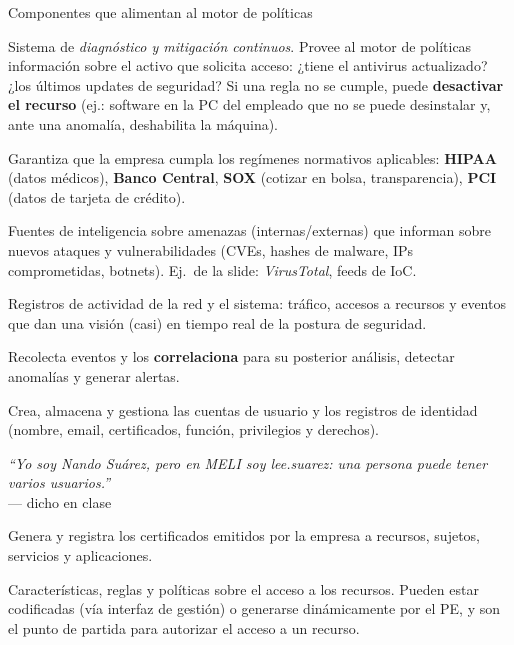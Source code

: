 \documentclass[11pt,a4paper]{article}
\newcommand{\prof}[1]{\par\medskip\noindent\textit{``#1''}\\[-2pt]\hspace*{1em}%
  {\footnotesize\textcolor{black!60}{--- dicho en clase}}\par\medskip\noindent}
\begin{document}
\begin{defbox}{Componentes que alimentan al motor de políticas}
\begin{description}[leftmargin=0pt,labelsep=0.4em,style=nextline,itemsep=2pt]
  \item[CDM — Continuous Diagnostics and Mitigation] Sistema de \emph{diagnóstico y mitigación
        continuos}. Provee al motor de políticas información sobre el activo que solicita acceso:
        ¿tiene el antivirus actualizado? ¿los últimos updates de seguridad? Si una regla no se
        cumple, puede \textbf{desactivar el recurso} (ej.: software en la PC del empleado que no
        se puede desinstalar y, ante una anomalía, deshabilita la máquina).
  \item[Industry Compliance] Garantiza que la empresa cumpla los regímenes normativos
        aplicables: \textbf{HIPAA} (datos médicos), \textbf{Banco Central}, \textbf{SOX}
        (cotizar en bolsa, transparencia), \textbf{PCI} (datos de tarjeta de crédito).
  \item[Threat Intelligence] Fuentes de inteligencia sobre amenazas (internas/externas) que
        informan sobre nuevos ataques y vulnerabilidades (CVEs, hashes de malware, IPs
        comprometidas, botnets). Ej.\ de la slide: \emph{VirusTotal}, feeds de IoC.
  \item[Activity Logs] Registros de actividad de la red y el sistema: tráfico, accesos a
        recursos y eventos que dan una visión (casi) en tiempo real de la postura de seguridad.
  \item[SIEM — Security Information and Event Management] Recolecta eventos y los
        \textbf{correlaciona} para su posterior análisis, detectar anomalías y generar alertas.
  \item[ID Management] Crea, almacena y gestiona las cuentas de usuario y los registros de
        identidad (nombre, email, certificados, función, privilegios y derechos). \prof{Yo soy
        Nando Suárez, pero en MELI soy lee.suarez: una persona puede tener varios usuarios.}
  \item[PKI — Public Key Infrastructure] Genera y registra los certificados emitidos por la
        empresa a recursos, sujetos, servicios y aplicaciones.
  \item[Data Access Policy] Características, reglas y políticas sobre el acceso a los recursos.
        Pueden estar codificadas (vía interfaz de gestión) o generarse dinámicamente por el PE,
        y son el punto de partida para autorizar el acceso a un recurso.
\end{description}
\end{defbox}
\end{document}
